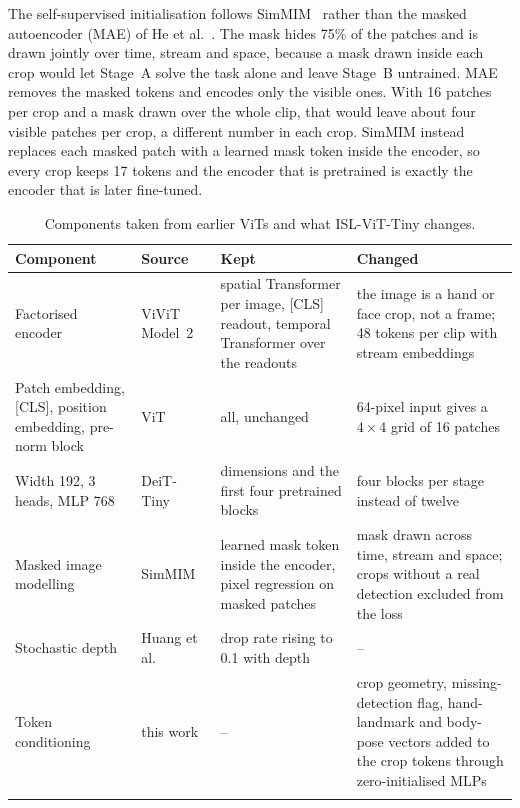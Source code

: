 \documentclass[pdflatex,sn-mathphys-num,twocolumn]{sn-jnl}
\newlength\origtw
\newenvironment{widetable}[1][tbp]{\begin{table}[#1]\centering\begin{minipage}{\origtw}\setlength\textwidth{\origtw}\setlength\columnwidth{\origtw}\begin{center}\begin{threeparttable}\tablebodyfont\renewcommand\footnotetext[2][]{{\removelastskip\vskip3pt\let\tablebodyfont\tablefootnotefont\hskip0pt\if!##1!\else{\smash{$^{##1}$}}\fi##2\par}}}{\end{threeparttable}\end{center}\end{minipage}\end{table}}
\theoremstyle{thmstyleone}%
\begin{document}
\begin{appendices}
The self-supervised initialisation follows SimMIM~\cite{xie2022simmim} rather than the masked autoencoder (MAE) of He et al.~\cite{he2022mae}. The mask hides 75\% of the patches and is drawn jointly over time, stream and space, because a mask drawn inside each crop would let Stage~A solve the task alone and leave Stage~B untrained. MAE removes the masked tokens and encodes only the visible ones. With 16 patches per crop and a mask drawn over the whole clip, that would leave about four visible patches per crop, a different number in each crop. SimMIM instead replaces each masked patch with a learned mask token inside the encoder, so every crop keeps 17 tokens and the encoder that is pretrained is exactly the encoder that is later fine-tuned.

\begin{widetable}[tb]
\caption{Components taken from earlier ViTs and what ISL-ViT-Tiny changes.}\label{tab:borrow}
\scriptsize
\setlength{\tabcolsep}{3pt}
\begin{tabularx}{\textwidth}{@{}L{2.4cm}L{2.0cm}YY@{}}
\toprule
Component & Source & Kept & Changed \\
\midrule
Factorised encoder & ViViT Model~2~\cite{arnab2021vivit} & spatial Transformer per image, [CLS] readout, temporal Transformer over the readouts & the image is a hand or face crop, not a frame; 48 tokens per clip with stream embeddings \\\addlinespace[2.5pt]
Patch embedding, [CLS], position embedding, pre-norm block & ViT~\cite{dosovitskiy2021vit} & all, unchanged & 64-pixel input gives a $4\times4$ grid of 16 patches \\\addlinespace[2.5pt]
Width 192, 3 heads, MLP 768 & DeiT-Tiny~\cite{touvron2021deit} & dimensions and the first four pretrained blocks & four blocks per stage instead of twelve \\\addlinespace[2.5pt]
Masked image modelling & SimMIM~\cite{xie2022simmim} & learned mask token inside the encoder, pixel regression on masked patches & mask drawn across time, stream and space; crops without a real detection excluded from the loss \\\addlinespace[2.5pt]
Stochastic depth & Huang et al.~\cite{huang2016stochdepth} & drop rate rising to 0.1 with depth & -- \\\addlinespace[2.5pt]
Token conditioning & this work & -- & crop geometry, missing-detection flag, hand-landmark and body-pose vectors added to the crop tokens through zero-initialised MLPs \\
\botrule
\end{tabularx}
\end{widetable}


\end{appendices}
\end{document}
